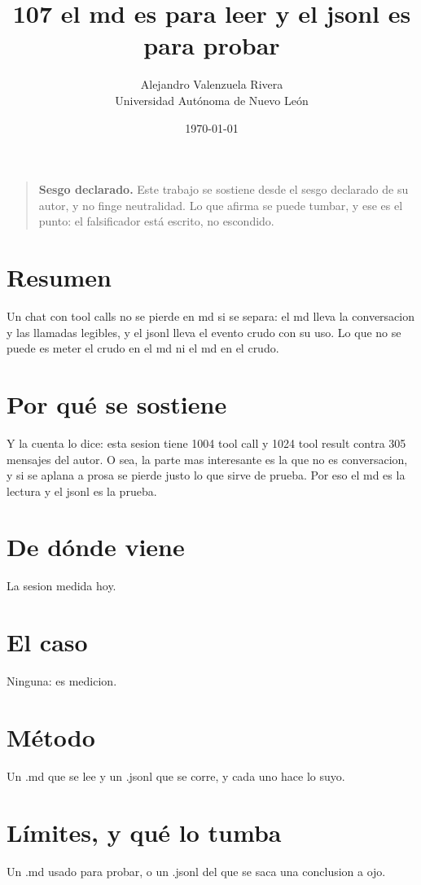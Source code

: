 \documentclass[11pt,a4paper]{article}
\title{107 el md es para leer y el jsonl es para probar}
\author{Alejandro Valenzuela Rivera\\\small Universidad Autónoma de Nuevo León}
\date{\today}
\begin{document}
\maketitle

\begin{quote}
\textbf{Sesgo declarado.} Este trabajo se sostiene desde el sesgo declarado de su autor, y no finge neutralidad. Lo que afirma se puede tumbar, y ese es el punto: el falsificador está escrito, no escondido.
\end{quote}

\section*{Resumen}
Un chat con tool calls no se pierde en md si se separa: el md lleva la conversacion y las llamadas legibles, y el jsonl lleva el evento crudo con su uso. Lo que no se puede es meter el crudo en el md ni el md en el crudo.

\section{Por qué se sostiene}
Y la cuenta lo dice: esta sesion tiene 1004 tool call y 1024 tool result contra 305 mensajes del autor. O sea, la parte mas interesante es la que no es conversacion, y si se aplana a prosa se pierde justo lo que sirve de prueba. Por eso el md es la lectura y el jsonl es la prueba.

\section{De dónde viene}
La sesion medida hoy.

\section{El caso}
Ninguna: es medicion.

\section{Método}
Un .md que se lee y un .jsonl que se corre, y cada uno hace lo suyo.

\section{Límites, y qué lo tumba}
Un .md usado para probar, o un .jsonl del que se saca una conclusion a ojo.
\end{document}
